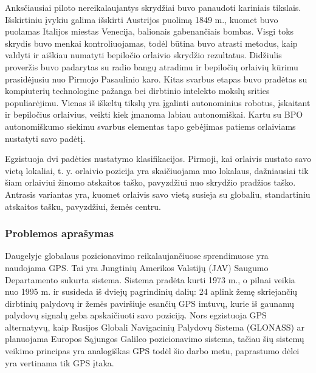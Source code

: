 \documentclass[a4paper,12pt]{article}
\begin{document}
		Anksčiausiai piloto nereikalaujantys skrydžiai buvo panaudoti kariniais tikslais. Išskirtiniu įvykiu galima išskirti Austrijos puolimą 1849 m., kuomet buvo puolamas Italijos miestas Venecija, balionais gabenančiais bombas. Visgi toks skrydis buvo menkai kontroliuojamas, todėl būtina buvo atrasti metodus, kaip valdyti ir aiškiau numatyti bepiločio orlaivio skrydžio rezultatus. Didžiulis proveržis buvo padarytas su radio bangų atradimu ir bepiločių orlaivių kūrimu prasidėjusiu nuo Pirmojo Pasaulinio karo. Kitas svarbus etapas buvo pradėtas su kompiuterių technologine pažanga bei dirbtinio intelekto mokslų srities populiarėjimu. Vienas iš iškeltų tikslų yra įgalinti autonominius robotus, įskaitant ir bepiločius orlaivius, veikti kiek įmanoma labiau autonomiškai. Kartu su BPO autonomiškumo siekimu svarbus elementas tapo gebėjimas patiems orlaiviams nustatyti savo padėtį.
		
		Egzistuoja dvi padėties nustatymo klasifikacijos. Pirmoji, kai orlaivis nustato savo vietą lokaliai, t. y. orlaivio pozicija yra skaičiuojama nuo lokalaus, dažniausiai tik šiam orlaiviui žinomo atskaitos taško, pavyzdžiui nuo skrydžio pradžios taško. Antrasis variantas yra, kuomet orlaivis savo vietą susieja su globaliu, standartiniu atskaitos tašku, pavyzdžiui, žemės centru.
		
		\subsubsection*{Problemos aprašymas}
					
		Daugelyje globalaus pozicionavimo reikalaujančiuose sprendimuose yra naudojama \acrfull{GPS}. Tai yra Jungtinių Amerikos Valstijų (JAV) Saugumo Departamento sukurta sistema. Sistema pradėta kurti 1973 m., o pilnai veikia nuo 1995 m. ir susideda iš dviejų pagrindinių dalių: 24 aplink žemę skriejančių dirbtinių palydovų ir žemės paviršiuje esančių GPS imtuvų, kurie iš gaunamų palydovų signalų geba apskaičiuoti savo poziciją. Nors egzistuoja GPS alternatyvų, kaip Rusijos Globali Navigacinių Palydovų Sistema (GLONASS) ar planuojama Europos Sąjungos Galileo pozicionavimo sistema, tačiau šių sistemų veikimo principas yra analogiškas GPS todėl šio darbo metu, paprastumo dėlei yra vertinama tik GPS įtaka.   
				
\end{document}
